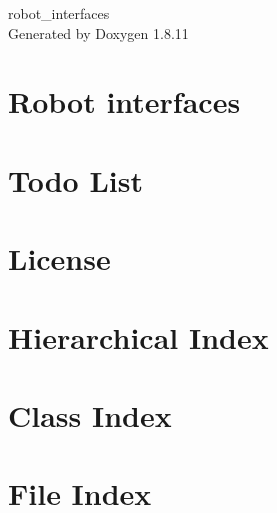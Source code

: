 \documentclass[twoside]{book}
\newcommand{\+}{\discretionary{\mbox{\scriptsize$\hookleftarrow$}}{}{}}
\newcommand{\clearemptydoublepage}{%
  \newpage{\pagestyle{empty}\cleardoublepage}%
}
\begin{document}
\hypersetup{pageanchor=false,
             bookmarksnumbered=true,
             pdfencoding=unicode
            }
\begin{titlepage}
\vspace*{7cm}
\begin{center}%
{\Large robot\+\_\+interfaces }\\
\vspace*{1cm}
{\large Generated by Doxygen 1.8.11}\\
\end{center}
\end{titlepage}
\clearemptydoublepage
\tableofcontents
\clearemptydoublepage
{}
\hypersetup{pageanchor=true}

\chapter{Robot interfaces}
\label{md_readme}
\hypertarget{md_readme}{}

\chapter{Todo List}
\label{todo}
\hypertarget{todo}{}

\chapter{License}
\label{license}
\hypertarget{license}{}

\chapter{Hierarchical Index}

\chapter{Class Index}

\chapter{File Index}

\end{document}

